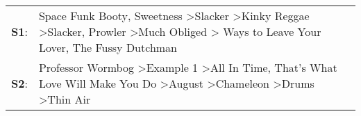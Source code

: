 \begin{supertabular}{p{0.03\textwidth}p{0.92\textwidth}}
 \textbf{S1}:  &  Space Funk Booty\textsuperscript{}, \enspace Sweetness\textsuperscript{} \textgreater \enspace Slacker\textsuperscript{} \textgreater \enspace Kinky Reggae\textsuperscript{} \textgreater \enspace Slacker\textsuperscript{}, \enspace Prowler\textsuperscript{} \textgreater \enspace Much Obliged\textsuperscript{} \textgreater {} Ways to Leave Your Lover\textsuperscript{}, \enspace The Fussy Dutchman\textsuperscript{}  \enspace  \\
 \textbf{S2}:  &                                    Professor Wormbog\textsuperscript{} \textgreater \enspace Example 1\textsuperscript{} \textgreater \enspace All In Time\textsuperscript{}, \enspace That's What Love Will Make You Do\textsuperscript{} \textgreater \enspace August\textsuperscript{} \textgreater \enspace Chameleon\textsuperscript{} \textgreater \enspace Drums\textsuperscript{} \textgreater \enspace Thin Air\textsuperscript{}  \enspace  \\
\end{supertabular}
